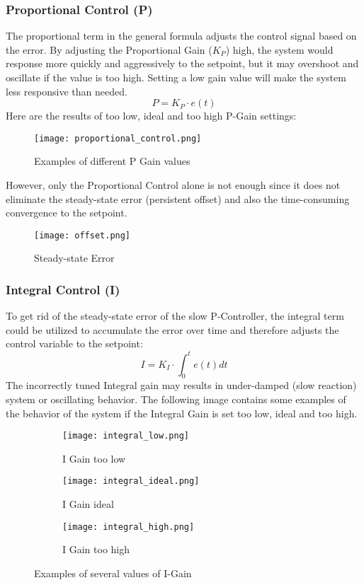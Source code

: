 \subsubsection{Proportional Control (P)}
The proportional term in the general formula adjusts the control signal based on the error.
By adjusting the Proportional Gain ($K_P$) high, the system would response more quickly and aggressively to the setpoint, but it may overshoot and oscillate if the value is too high. Setting a low gain value will make the system less responsive than needed.
$$P = K_P \cdot e(t)$$
Here are the results of too low, ideal and too high P-Gain settings:
\begin{figure}[H]
  \centering
  \texttt{[image: proportional\_control.png]}
  \caption{Examples of different P Gain values}
\end{figure}
\noindent
However, only the Proportional Control alone is not enough since it does not eliminate the steady-state error (persistent offset) and also the time-consuming convergence to the setpoint.

\begin{figure}[H]
  \centering
  \texttt{[image: offset.png]}
  \caption{Steady-state Error}
\end{figure}

\subsubsection{Integral Control (I)}
To get rid of the steady-state error of the slow P-Controller, the integral term could be utilized to accumulate the error over time and therefore adjusts the control variable to the setpoint:
$$I = K_I\cdot\int_0^t e(t)dt$$
The incorrectly tuned Integral gain may results in under-damped (slow reaction) system or oscillating behavior.
The following image contains some examples of the behavior of the system if the Integral Gain is set too low, ideal and too high.
\begin{figure}[H]
  \centering
  \begin{subfigure}[b]{0.3\textwidth}
    \texttt{[image: integral\_low.png]}
    \caption{I Gain too low}
  \end{subfigure}
  \hfill
  \begin{subfigure}[b]{0.3\textwidth}
    \texttt{[image: integral\_ideal.png]}
    \caption{I Gain ideal}
  \end{subfigure}
  \hfill
  \begin{subfigure}[b]{0.3\textwidth}
    \texttt{[image: integral\_high.png]}
    \caption{I Gain too high}
  \end{subfigure}
  \caption{Examples of several values of I-Gain}
\end{figure}

